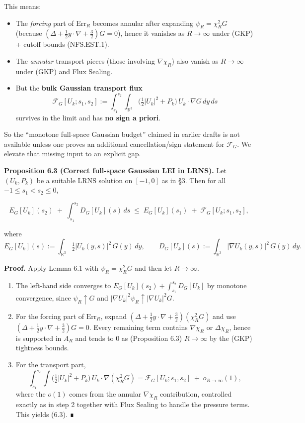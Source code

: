 \documentclass[
  11pt,
]{article}
\providecommand{\tightlist}{%
  \setlength{\itemsep}{0pt}\setlength{\parskip}{0pt}}
\begin{document}
This means:

\begin{itemize}
\tightlist
\item
  The \emph{forcing} part of \(\mathrm{Err}_R\) becomes annular after expanding \(\psi_R=\chi_R^2G\) (because \((\Delta+\tfrac12 y\!\cdot\!\nabla+\tfrac32)G=0\)), hence it vanishes as \(R\to\infty\) under (GKP) + cutoff bounds (NFS.EST.1).
\item
  The \emph{annular} transport pieces (those involving \(\nabla\chi_R\)) also vanish as \(R\to\infty\) under (GKP) and Flux Sealing.
\item
  But the \textbf{bulk Gaussian transport flux} \[
   \mathcal F_G[U_k; s_1,s_2]
   :=\int_{s_1}^{s_2}\!\!\int_{\mathbb R^3}
   \Big(\tfrac12|U_k|^2+P_k\Big)\,U_k\cdot\nabla G\,dy\,ds
   \] survives in the limit and has \textbf{no sign a priori}.
\end{itemize}

So the ``monotone full-space Gaussian budget'' claimed in earlier drafts is not available unless one proves an additional cancellation/sign statement for \(\mathcal F_G\). We elevate that missing input to an explicit gap.

\textbf{Proposition 6.3 (Correct full-space Gaussian LEI in LRNS).} Let \((U_k,P_k)\) be a suitable LRNS solution on \([-1,0]\) as in §3. Then for all \(-1\le s_1<s_2\le 0\),

\begin{equation}
E_G[U_k](s_2)\;+\;\int_{s_1}^{s_2}D_G[U_k](s)\,ds
\;\le\;
E_G[U_k](s_1)\;+\;\mathcal F_G[U_k;s_1,s_2],
\tag{6.3}
\end{equation}

where \[
E_G[U_k](s):=\int_{\mathbb R^3}\tfrac12|U_k(y,s)|^2\,G(y)\,dy,\qquad
D_G[U_k](s):=\int_{\mathbb R^3}|\nabla U_k(y,s)|^2\,G(y)\,dy.
\]

\textbf{Proof.} Apply Lemma 6.1 with \(\psi_R=\chi_R^2G\) and then let \(R\to\infty\).

\begin{enumerate}
\def\labelenumi{\arabic{enumi}.}
\item
  The left-hand side converges to \(E_G[U_k](s_2)+\int_{s_1}^{s_2}D_G[U_k]\) by monotone convergence, since \(\psi_R\uparrow G\) and \(|\nabla U_k|^2\psi_R\uparrow|\nabla U_k|^2G\).
\item
  For the forcing part of \(\mathrm{Err}_R\), expand \((\Delta+\tfrac12y\!\cdot\!\nabla+\tfrac32)(\chi_R^2G)\) and use \((\Delta+\tfrac12y\!\cdot\!\nabla+\tfrac32)G=0\). Every remaining term contains \(\nabla\chi_R\) or \(\Delta\chi_R\), hence is supported in \(A_R\) and tends to \(0\) as (Proposition 6.3) \(R\to\infty\) by the (GKP) tightness bounds.
\item
  For the transport part, \[
   \int_{s_1}^{s_2}\!\!\int\Big(\tfrac12|U_k|^2+P_k\Big)\,U_k\cdot\nabla(\chi_R^2G)
   =\mathcal F_G[U_k;s_1,s_2] \;+\; o_{R\to\infty}(1),
   \] where the \(o(1)\) comes from the annular \(\nabla\chi_R\) contribution, controlled exactly as in step 2 together with Flux Sealing to handle the pressure terms. This yields (6.3). ∎
\end{enumerate}
\end{document}

